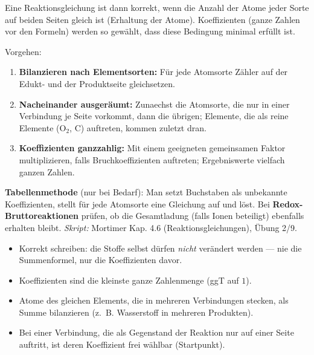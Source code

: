 

Eine Reaktionsgleichung ist dann korrekt, wenn die Anzahl der Atome jeder
Sorte auf beiden Seiten gleich ist (Erhaltung der Atome). Koeffizienten
(ganze Zahlen vor den Formeln) werden so gewählt, dass diese Bedingung
minimal erfüllt ist.

\begin{werkzeugkasten}
Vorgehen:
\begin{enumerate}
  \item \textbf{Bilanzieren nach Elementsorten:} Für jede Atomsorte
        Zähler auf der Edukt- und der Produktseite gleichsetzen.
  \item \textbf{Nacheinander ausgeräumt:} Zunaechst die Atomsorte, die nur in
        einer Verbindung je Seite vorkommt, dann die übrigen; Elemente, die
        als reine Elemente ($\mathrm{O_2}$, $\mathrm{C}$) auftreten, kommen
        zuletzt dran.
  \item \textbf{Koeffizienten ganzzahlig:} Mit einem geeigneten gemeinsamen
        Faktor multiplizieren, falls Bruchkoeffizienten auftreten; Ergebniswerte
        vielfach ganzen Zahlen.
\end{enumerate}
\textbf{Tabellenmethode} (nur bei Bedarf): Man setzt Buchstaben als unbekannte
Koeffizienten, stellt für jede Atomsorte eine Gleichung auf und löst.
Bei \textbf{Redox-Bruttoreaktionen} prüfen, ob die Gesamtladung (falls Ionen
beteiligt) ebenfalls erhalten bleibt.
\textit{Skript:} Mortimer Kap. 4.6 (Reaktionsgleichungen), Übung 2/9.
\end{werkzeugkasten}

\begin{achtung}
\begin{itemize}
  \item Korrekt schreiben: die Stoffe selbst dürfen \emph{nicht} verändert
        werden --- nie die Summenformel, nur die Koeffizienten davor.
  \item Koeffizienten sind die kleinste ganze Zahlenmenge (ggT auf $1$).
  \item Atome des gleichen Elements, die in mehreren Verbindungen stecken,
        als Summe bilanzieren (z.~B. Wasserstoff in mehreren Produkten).
  \item Bei einer Verbindung, die als Gegenstand der Reaktion nur auf einer
        Seite auftritt, ist deren Koeffizient frei wählbar (Startpunkt).
\end{itemize}
\end{achtung}
